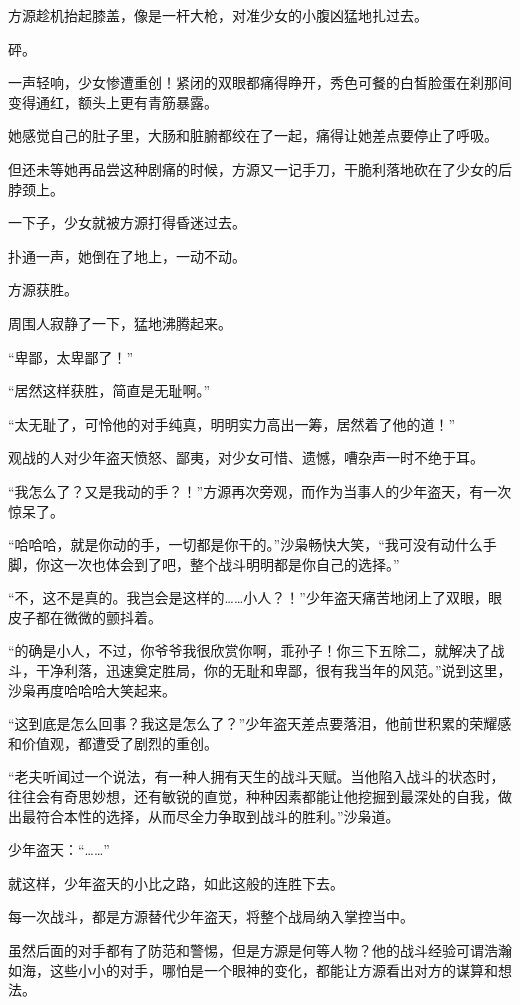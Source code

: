 \begin{this_body}
方源趁机抬起膝盖，像是一杆大枪，对准少女的小腹凶猛地扎过去。

砰。

一声轻响，少女惨遭重创！紧闭的双眼都痛得睁开，秀色可餐的白皙脸蛋在刹那间变得通红，额头上更有青筋暴露。

她感觉自己的肚子里，大肠和脏腑都绞在了一起，痛得让她差点要停止了呼吸。

但还未等她再品尝这种剧痛的时候，方源又一记手刀，干脆利落地砍在了少女的后脖颈上。

一下子，少女就被方源打得昏迷过去。

扑通一声，她倒在了地上，一动不动。

方源获胜。

周围人寂静了一下，猛地沸腾起来。

“卑鄙，太卑鄙了！”

“居然这样获胜，简直是无耻啊。”

“太无耻了，可怜他的对手纯真，明明实力高出一筹，居然着了他的道！”

观战的人对少年盗天愤怒、鄙夷，对少女可惜、遗憾，嘈杂声一时不绝于耳。

“我怎么了？又是我动的手？！”方源再次旁观，而作为当事人的少年盗天，有一次惊呆了。

“哈哈哈，就是你动的手，一切都是你干的。”沙枭畅快大笑，“我可没有动什么手脚，你这一次也体会到了吧，整个战斗明明都是你自己的选择。”

“不，这不是真的。我岂会是这样的……小人？！”少年盗天痛苦地闭上了双眼，眼皮子都在微微的颤抖着。

“的确是小人，不过，你爷爷我很欣赏你啊，乖孙子！你三下五除二，就解决了战斗，干净利落，迅速奠定胜局，你的无耻和卑鄙，很有我当年的风范。”说到这里，沙枭再度哈哈哈大笑起来。

“这到底是怎么回事？我这是怎么了？”少年盗天差点要落泪，他前世积累的荣耀感和价值观，都遭受了剧烈的重创。

“老夫听闻过一个说法，有一种人拥有天生的战斗天赋。当他陷入战斗的状态时，往往会有奇思妙想，还有敏锐的直觉，种种因素都能让他挖掘到最深处的自我，做出最符合本性的选择，从而尽全力争取到战斗的胜利。”沙枭道。

少年盗天：“……”

就这样，少年盗天的小比之路，如此这般的连胜下去。

每一次战斗，都是方源替代少年盗天，将整个战局纳入掌控当中。

虽然后面的对手都有了防范和警惕，但是方源是何等人物？他的战斗经验可谓浩瀚如海，这些小小的对手，哪怕是一个眼神的变化，都能让方源看出对方的谋算和想法。


\end{this_body}
